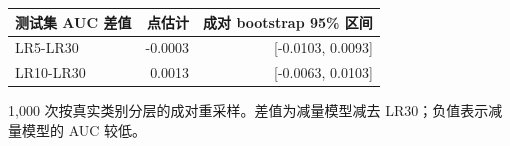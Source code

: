 \begin{center}
\small
\setlength{\tabcolsep}{5pt}
\renewcommand{\arraystretch}{1.25}
\begin{tabular}{lrr}
\toprule
测试集 AUC 差值 & 点估计 & 成对 bootstrap 95\% 区间 \tabularnewline
\midrule
LR5-LR30 & -0.0003 & [-0.0103, 0.0093] \tabularnewline
LR10-LR30 & 0.0013 & [-0.0063, 0.0103] \tabularnewline
\bottomrule
\end{tabular}
\end{center}
{\footnotesize 1,000 次按真实类别分层的成对重采样。差值为减量模型减去 LR30；负值表示减量模型的 AUC 较低。}
